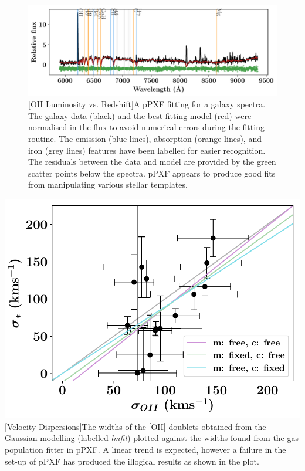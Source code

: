 \documentclass[12pt, twocolumn]{revtex4}    %
\begin{document}
\begin{figure}
\includegraphics[width=1.0\linewidth]{data/cube_1804_spectra_complete}
\captionsetup{justification=raggedright}
[OII Luminosity vs. Redshift]{A pPXF fitting for a galaxy spectra. The galaxy data (black) and  the best-fitting model (red) were normalised in the flux to avoid numerical errors during the fitting routine. The emission (blue lines), absorption (orange lines), and iron (grey lines) features have been labelled for easier recognition. The residuals between the data and model are provided by the green scatter points below the spectra. pPXF appears to produce good fits from manipulating various stellar templates.}
\label{fig:ppxf_spectra}
\end{figure}


\begin{center}
\includegraphics[width=1.0\linewidth]{data/sigma_star_vs_sigma_oii}
[Velocity Dispersions]{The widths of the [OII] doublets obtained from the Gaussian modelling (labelled \textit{lmfit}) plotted against the widths found from the gas population fitter in pPXF. A linear trend is expected, however a failure in the set-up of pPXF has produced the illogical results as shown in the plot.}
\label{fig:velocity_dispersions}
\end{center}
\end{document}
